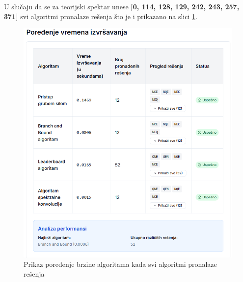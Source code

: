 \documentclass[12pt,oneside]{memoir}
\begin{document}
U slučaju da se za teorijski spektar unese \textbf{[0, 114, 128, 129, 242, 243, 257, 371]} svi algoritmi pronalaze rešenja što je i prikazano na slici \ref{fig:comparison_all_solution}.
\begin{figure}[H]
\centering
\includegraphics[width=1\textwidth]{images/comparison_all_solution.png}
\caption{Prikaz poređenje brzine algoritama kada svi algoritmi pronalaze rešenja}
\label{fig:comparison_all_solution}
\end{figure}
\end{document}

